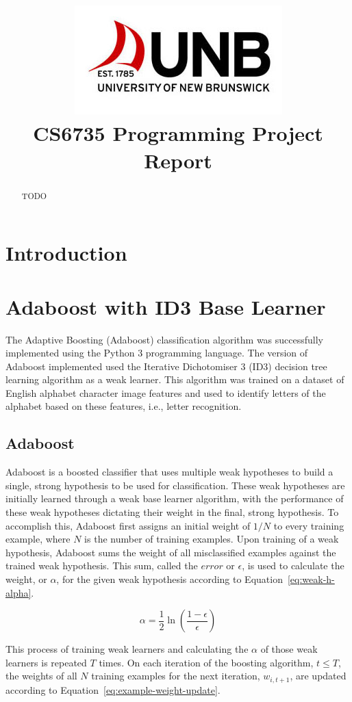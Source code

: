 \documentclass[a4paper]{article}
\title{\includegraphics[scale=0.75]{images/unblogo.jpg}\\CS6735 Programming Project Report}
\begin{document}
\maketitle

\begin{abstract}
    TODO
\end{abstract}

\newpage

\section{Introduction}

\section{Adaboost with ID3 Base Learner}
The Adaptive Boosting (Adaboost) classification algorithm was successfully implemented using the Python 3 programming language. The version of Adaboost implemented used the Iterative Dichotomiser 3 (ID3) decision tree learning algorithm as a weak learner. This algorithm was trained on a dataset of English alphabet character image features and used to identify letters of the alphabet based on these features, i.e., letter recognition.

\subsection{Adaboost}
Adaboost is a boosted classifier that uses multiple weak hypotheses to build a single, strong hypothesis to be used for classification. These weak hypotheses are initially learned through a weak base learner algorithm, with the performance of these weak hypotheses dictating their weight in the final, strong hypothesis. To accomplish this, Adaboost first assigns an initial weight of $1/N$ to every training example, where $N$ is the number of training examples. Upon training of a weak hypothesis, Adaboost sums the weight of all misclassified examples against the trained weak hypothesis.  This sum, called the $error$ or $\epsilon$, is used to calculate the weight, or $\alpha$, for the given weak hypothesis according to Equation~\ref{eq:weak-h-alpha}.

\begin{equation}
    \label{eq:weak-h-alpha}
    \alpha = \frac{1}{2}\ln\left(\frac{1-\epsilon}{\epsilon}\right)
\end{equation}

This process of training weak learners and calculating the $\alpha$ of those weak learners is repeated $T$ times. On each iteration of the boosting algorithm, $t \le T$, the weights of all $N$ training examples for the next iteration, $w_{i, t+1}$, are updated according to Equation~\ref{eq:example-weight-update}.
\end{document}
